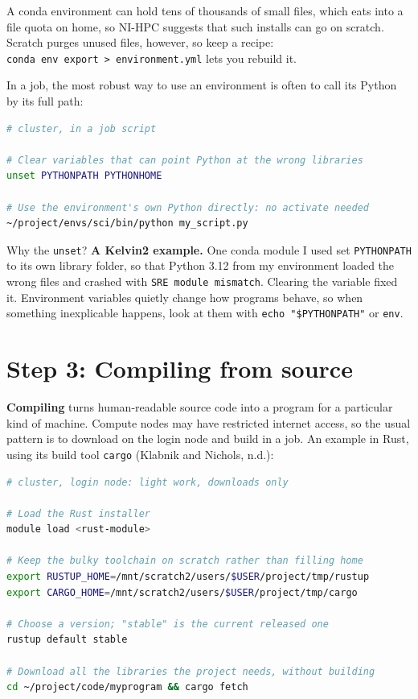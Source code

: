 A conda environment can hold tens of thousands of small files, which eats into a file quota on home, so NI-HPC suggests that such installs can go on scratch. Scratch purges unused files, however, so keep a recipe: \texttt{conda\ env\ export\ \textgreater{}\ environment.yml} lets you rebuild it.

In a job, the most robust way to use an environment is often to call its Python by its full path:

\begin{lstlisting}[language=bash]
# cluster, in a job script

# Clear variables that can point Python at the wrong libraries
unset PYTHONPATH PYTHONHOME

# Use the environment's own Python directly: no activate needed
~/project/envs/sci/bin/python my_script.py
\end{lstlisting}

Why the \texttt{unset}? \textbf{A Kelvin2 example.} One conda module I used set \texttt{PYTHONPATH} to its own library folder, so that Python 3.12 from my environment loaded the wrong files and crashed with \texttt{SRE\ module\ mismatch}. Clearing the variable fixed it. Environment variables quietly change how programs behave, so when something inexplicable happens, look at them with \texttt{echo\ "\$PYTHONPATH"} or \texttt{env}.

\section{Step 3: Compiling from source}\label{step-3-compiling-from-source}

\textbf{Compiling} turns human-readable source code into a program for a particular kind of machine. Compute nodes may have restricted internet access, so the usual pattern is to download on the login node and build in a job. An example in Rust, using its build tool \texttt{cargo} (Klabnik and Nichols, n.d.):

\begin{lstlisting}[language=bash]
# cluster, login node: light work, downloads only

# Load the Rust installer
module load <rust-module>

# Keep the bulky toolchain on scratch rather than filling home
export RUSTUP_HOME=/mnt/scratch2/users/$USER/project/tmp/rustup
export CARGO_HOME=/mnt/scratch2/users/$USER/project/tmp/cargo

# Choose a version; "stable" is the current released one
rustup default stable

# Download all the libraries the project needs, without building
cd ~/project/code/myprogram && cargo fetch
\end{lstlisting}

